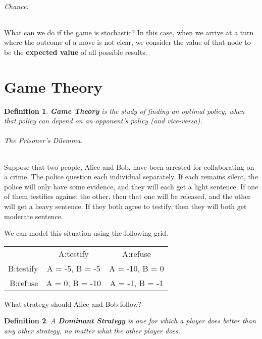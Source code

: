 \documentclass[10pt,a4paper]{article}
\newtheorem{defin}{Definition}
\begin{document}
\paragraph{Chance.} What can we do if the game is stochastic? In this case, when we arrive at a turn where the outcome of a move is not clear, we consider the value of that node to be the \textbf{expected value} of all possible results.


\part{Game Theory}

\begin{defin}
\emph{\textbf{Game Theory}} is the study of finding an optimal policy, when that policy can depend on an opponent's policy (and vice-versa).
\end{defin}

\paragraph{The Prisoner's Dilemma.} Suppose that two people, Alice and Bob, have been arrested for collaborating on a crime. The police question each individual separately. If each remains silent, the police will only have some evidence, and they will each get a light sentence. If one of them testifies against the other, then that one will be released, and the other will get a heavy sentence. If they both agree to testify, then they will both get moderate sentence.

We can model this situation using the following grid.
\begin{center}
\begin{tabular}{r|c|c|}
\multicolumn{1}{r}{} & \multicolumn{1}{c}{A:testify} & \multicolumn{1}{c}{A:refuse} \\
\cline{2-3}
B:testify & A = -5, B = -5 & A = -10, B = 0 \\
\cline{2-3}
B:refuse & A = 0, B = -10 & A = -1, B = -1 \\
\cline{2-3}
\end{tabular}
\end{center}
What strategy should Alice and Bob follow?

\begin{defin}
A \emph{\textbf{Dominant Strategy}} is one for which a player does better than any other strategy, no matter what the other player does.
\end{defin}
\end{document}
